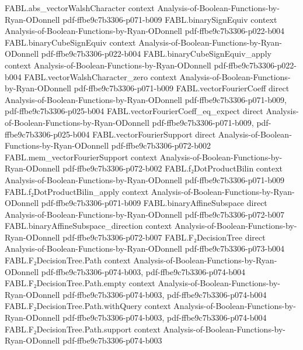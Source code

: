 \begin{theorem}
\proofstep
  {FABL.abs_vectorWalshCharacter}
  {context}
  {Analysis-of-Boolean-Functions-by-Ryan-ODonnell}
  {pdf-ffbe9c7b3306-p071-b009}
\proofstep
  {FABL.binarySignEquiv}
  {context}
  {Analysis-of-Boolean-Functions-by-Ryan-ODonnell}
  {pdf-ffbe9c7b3306-p022-b004}
\proofstep
  {FABL.binaryCubeSignEquiv}
  {context}
  {Analysis-of-Boolean-Functions-by-Ryan-ODonnell}
  {pdf-ffbe9c7b3306-p022-b004}
\proofstep
  {FABL.binaryCubeSignEquiv_apply}
  {context}
  {Analysis-of-Boolean-Functions-by-Ryan-ODonnell}
  {pdf-ffbe9c7b3306-p022-b004}
\proofstep
  {FABL.vectorWalshCharacter_zero}
  {context}
  {Analysis-of-Boolean-Functions-by-Ryan-ODonnell}
  {pdf-ffbe9c7b3306-p071-b009}
\proofstep
  {FABL.vectorFourierCoeff}
  {direct}
  {Analysis-of-Boolean-Functions-by-Ryan-ODonnell}
  {pdf-ffbe9c7b3306-p071-b009,
    pdf-ffbe9c7b3306-p025-b004}
\proofstep
  {FABL.vectorFourierCoeff_eq_expect}
  {direct}
  {Analysis-of-Boolean-Functions-by-Ryan-ODonnell}
  {pdf-ffbe9c7b3306-p071-b009,
    pdf-ffbe9c7b3306-p025-b004}
\proofstep
  {FABL.vectorFourierSupport}
  {direct}
  {Analysis-of-Boolean-Functions-by-Ryan-ODonnell}
  {pdf-ffbe9c7b3306-p072-b002}
\proofstep
  {FABL.mem_vectorFourierSupport}
  {context}
  {Analysis-of-Boolean-Functions-by-Ryan-ODonnell}
  {pdf-ffbe9c7b3306-p072-b002}
\proofstep
  {FABL.f₂DotProductBilin}
  {context}
  {Analysis-of-Boolean-Functions-by-Ryan-ODonnell}
  {pdf-ffbe9c7b3306-p071-b009}
\proofstep
  {FABL.f₂DotProductBilin_apply}
  {context}
  {Analysis-of-Boolean-Functions-by-Ryan-ODonnell}
  {pdf-ffbe9c7b3306-p071-b009}
\proofstep
  {FABL.binaryAffineSubspace}
  {direct}
  {Analysis-of-Boolean-Functions-by-Ryan-ODonnell}
  {pdf-ffbe9c7b3306-p072-b007}
\proofstep
  {FABL.binaryAffineSubspace_direction}
  {context}
  {Analysis-of-Boolean-Functions-by-Ryan-ODonnell}
  {pdf-ffbe9c7b3306-p072-b007}
\proofstep
  {FABL.F₂DecisionTree}
  {direct}
  {Analysis-of-Boolean-Functions-by-Ryan-ODonnell}
  {pdf-ffbe9c7b3306-p073-b004}
\proofstep
  {FABL.F₂DecisionTree.Path}
  {context}
  {Analysis-of-Boolean-Functions-by-Ryan-ODonnell}
  {pdf-ffbe9c7b3306-p074-b003,
    pdf-ffbe9c7b3306-p074-b004}
\proofstep
  {FABL.F₂DecisionTree.Path.empty}
  {context}
  {Analysis-of-Boolean-Functions-by-Ryan-ODonnell}
  {pdf-ffbe9c7b3306-p074-b003,
    pdf-ffbe9c7b3306-p074-b004}
\proofstep
  {FABL.F₂DecisionTree.Path.withQuery}
  {context}
  {Analysis-of-Boolean-Functions-by-Ryan-ODonnell}
  {pdf-ffbe9c7b3306-p074-b003,
    pdf-ffbe9c7b3306-p074-b004}
\proofstep
  {FABL.F₂DecisionTree.Path.support}
  {context}
  {Analysis-of-Boolean-Functions-by-Ryan-ODonnell}
  {pdf-ffbe9c7b3306-p074-b003}

\end{theorem}
